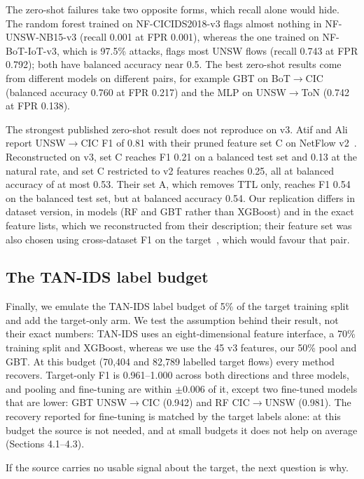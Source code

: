 \documentclass[11pt]{article}
\begin{document}
The zero-shot failures take two opposite forms, which recall alone would hide. The random forest trained on NF-CICIDS2018-v3 flags almost nothing in NF-UNSW-NB15-v3 (recall 0.001 at FPR 0.001), whereas the one trained on NF-BoT-IoT-v3, which is 97.5\% attacks, flags most UNSW flows (recall 0.743 at FPR 0.792); both have balanced accuracy near 0.5. The best zero-shot results come from different models on different pairs, for example GBT on BoT$\to$CIC (balanced accuracy 0.760 at FPR 0.217) and the MLP on UNSW$\to$ToN (0.742 at FPR 0.138).

The strongest published zero-shot result does not reproduce on v3. Atif and Ali report UNSW$\to$CIC F1 of 0.81 with their pruned feature set C on NetFlow v2~\cite{atif2026threeaxis}. Reconstructed on v3, set C reaches F1 0.21 on a balanced test set and 0.13 at the natural rate, and set C restricted to v2 features reaches 0.25, all at balanced accuracy of at most 0.53. Their set A, which removes TTL only, reaches F1 0.54 on the balanced test set, but at balanced accuracy 0.54. Our replication differs in dataset version, in models (RF and GBT rather than XGBoost) and in the exact feature lists, which we reconstructed from their description; their feature set was also chosen using cross-dataset F1 on the target~\cite{atif2026threeaxis}, which would favour that pair.

\subsection{The TAN-IDS label budget}

Finally, we emulate the TAN-IDS label budget of 5\% of the target training split~\cite{hathanh2026tanids} and add the target-only arm. We test the assumption behind their result, not their exact numbers: TAN-IDS uses an eight-dimensional feature interface, a 70\% training split and XGBoost, whereas we use the 45 v3 features, our 50\% pool and GBT. At this budget (70,404 and 82,789 labelled target flows) every method recovers. Target-only F1 is 0.961--1.000 across both directions and three models, and pooling and fine-tuning are within $\pm$0.006 of it, except two fine-tuned models that are lower: GBT UNSW$\to$CIC (0.942) and RF CIC$\to$UNSW (0.981). The recovery reported for fine-tuning is matched by the target labels alone: at this budget the source is not needed, and at small budgets it does not help on average (Sections 4.1--4.3).

If the source carries no usable signal about the target, the next question is why.
\end{document}
